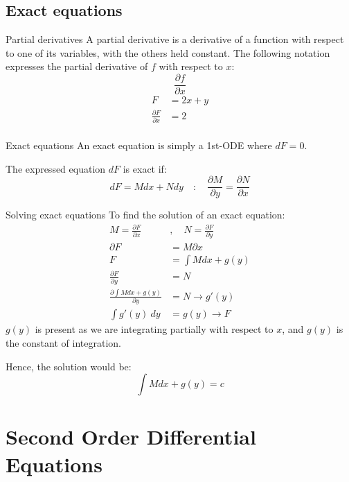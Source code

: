 \documentclass{article}
\begin{document}
\subsection{Exact equations}
\begin{knBox}
    {Partial derivatives}
    A partial derivative is a derivative of a function with respect to one of its variables, with the others held constant. The following notation expresses the partial derivative of $f$ with respect to $x$:
    \[\frac{\partial f}{\partial x}\]
    \tcblower
    \begin{align*}
        F                             & =2x+y \\
        \frac{\partial F}{\partial x} & =2    \\
    \end{align*}
\end{knBox}
\begin{definition}
    {Exact equations}
    An exact equation is simply a 1st-ODE where $dF=0$.

    The expressed equation $dF$ is exact if:
    \[dF=Mdx+Ndy\quad:\quad\frac{\partial M}{\partial y}=\frac{\partial N}{\partial x}\]
\end{definition}
\begin{theorem}
    {Solving exact equations}
    To find the solution of an exact equation:
    \begin{align*}
        M=\frac{\partial F}{\partial x}              & ,\quad N=\frac{\partial F}{\partial y} \\
        \partial F                                   & = M\partial x                          \\
        F                                            & = \int M dx + g(y)                     \\
        \frac{\partial F}{\partial y}                & = N                                    \\
        \frac{\partial \int M dx + g(y)}{\partial y} & = N \to g'(y)                          \\
        \int g'(y)\:dy                               & = g(y) \to F
    \end{align*}
    $g(y)$ is present as we are integrating partially with respect to $x$, and $g(y)$ is the constant of integration.

    Hence, the solution would be:
    \[\int M dx + g(y)=c\]
\end{theorem}

\section{Second Order Differential Equations}
\end{document}
